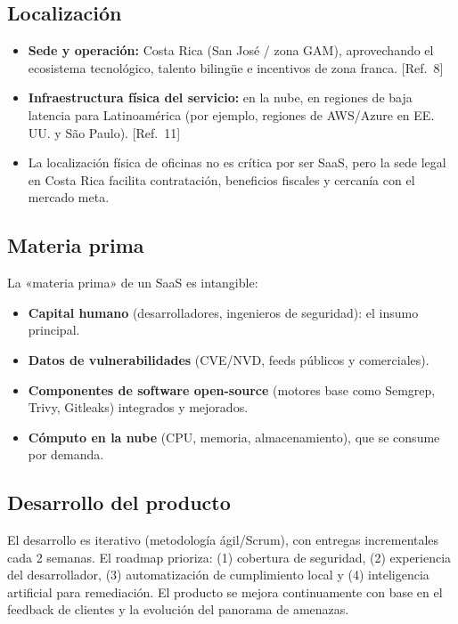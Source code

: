 \subsection{Localización}
\begin{itemize}
  \item \textbf{Sede y operación:} Costa Rica (San José / zona GAM), aprovechando el
        ecosistema tecnológico, talento bilingüe e incentivos de zona franca. [Ref.~8]
  \item \textbf{Infraestructura física del servicio:} en la nube, en regiones de baja
        latencia para Latinoamérica (por ejemplo, regiones de AWS/Azure en EE.\,UU. y
        São Paulo). [Ref.~11]
  \item La localización física de oficinas no es crítica por ser SaaS, pero la sede
        legal en Costa Rica facilita contratación, beneficios fiscales y cercanía con
        el mercado meta.
\end{itemize}

\subsection{Materia prima}
La «materia prima» de un SaaS es intangible:
\begin{itemize}
  \item \textbf{Capital humano} (desarrolladores, ingenieros de seguridad): el insumo principal.
  \item \textbf{Datos de vulnerabilidades} (CVE/NVD, feeds públicos y comerciales).
  \item \textbf{Componentes de software open-source} (motores base como Semgrep, Trivy,
        Gitleaks) integrados y mejorados.
  \item \textbf{Cómputo en la nube} (CPU, memoria, almacenamiento), que se consume por demanda.
\end{itemize}

\subsection{Desarrollo del producto}
El desarrollo es iterativo (metodología ágil/Scrum), con entregas incrementales cada 2
semanas. El roadmap prioriza: (1) cobertura de seguridad, (2) experiencia del
desarrollador, (3) automatización de cumplimiento local y (4) inteligencia artificial
para remediación. El producto se mejora continuamente con base en el feedback de
clientes y la evolución del panorama de amenazas.

